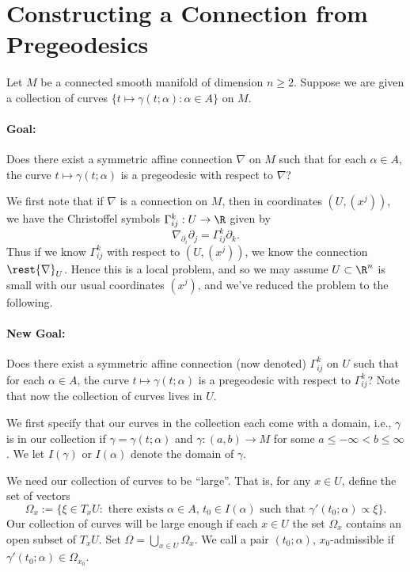 



\section{Constructing a Connection from Pregeodesics}

Let $M$ be a connected smooth manifold of dimension $n\geq 2$.  Suppose we are given a collection of curves $\{t\mapsto\gamma(t;\alpha):\alpha\in A\}$ on $M$.  

\paragraph{Goal:} Does there exist a symmetric affine connection $\nabla$ on $M$ such that for each $\alpha\in A$, the curve $t\mapsto\gamma(t;\alpha)$ is a pregeodesic with respect to $\nabla$?

We first note that if $\nabla$ is a connection on $M$, then in coordinates $(U,(x^j))$, we have the Christoffel symbols $\Gamma_{ij}^k:U\to\R$ given by
$$\nabla_{\partial_i}\partial_j=\Gamma_{ij}^k\partial_k.$$
Thus if we know $\Gamma_{ij}^k$ with respect to $(U,(x^j))$, we know the connection $\rest{\nabla}_U$.  Hence this is a local problem, and so we may assume $U\subset\R^n$ is small with our usual coordinates $(x^j)$, and we've reduced the problem to the following.

\paragraph{New Goal:} Does there exist a symmetric affine connection (now denoted) $\Gamma_{ij}^k$ on $U$ such that for each $\alpha\in A$, the curve $t\mapsto\gamma(t;\alpha)$ is a pregeodesic with respect to $\Gamma_{ij}^k$?  Note that now the collection of curves lives in $U$.

We first specify that our curves in the collection each come with a domain, i.e., $\gamma$ is in our collection if $\gamma=\gamma(t;\alpha)$ and $\gamma:(a,b)\to M$ for some $a\leq-\infty<b\leq\infty$.  We let $I(\gamma)$ or $I(\alpha)$ denote the domain of $\gamma$.  

We need our collection of curves to be ``large''.  That is, for any $x\in U$, define the set of vectors
$$\Omega_x:=\{\xi\in T_xU:\text{ there exists }\alpha\in A,\,t_0\in I(\alpha)\text{ such that }\gamma'(t_0;\alpha)\propto\xi\}.$$
Our collection of curves will be large enough if each $x\in U$ the set $\Omega_x$ contains an open subset of $T_xU$.  Set $\Omega=\bigcup_{x\in U}\Omega_x$.  We call a pair $(t_0;\alpha)$, $x_0$-admissible if $\gamma'(t_0;\alpha)\in\Omega_{x_0}$.



